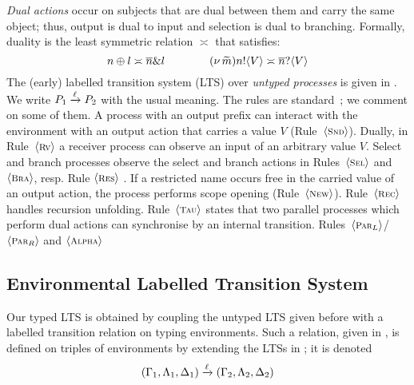 \emph{Dual actions}
occur on subjects that are dual between them and carry the same
object; thus, output is dual to input and 
selection is dual to branching.
Formally, duality 
is the least symmetric relation $\asymp$ that satisfies:
\[
	n \oplus l \asymp \overline{n} \& l
	\qquad \qquad 
	(\nu\, \widetilde{m}) n ! \langle V \rangle \asymp \overline{n} ? \langle V \rangle
\]
The (early) labelled transition system
(LTS) %
over \emph{untyped processes}
is given in
. 
We write $P_1 \xrightarrow{\ell} P_2$ with the usual meaning.
The rules are standard~\cite{KYHH2015,KY2015}; we comment on some of them.
A process with an output prefix can
interact with the environment with an output action that carries a value
$V$ (Rule~${\langle \text{\footnotesize \textsc{Snd}} \rangle}$).  Dually, in Rule~${\langle \text{\footnotesize \textsc{Rv}} \rangle}$ a
receiver process can observe an input of an arbitrary value $V$.
Select and branch processes observe the select and branch
actions in Rules~${\langle \text{\footnotesize \textsc{Sel}} \rangle}$ and ${\langle \text{\footnotesize \textsc{Bra}} \rangle}$, resp.
Rule ${\langle \text{\footnotesize \textsc{Res}} \rangle}$ 
. 
If a restricted name occurs free in
the carried value of an output action,
the process performs scope opening (Rule~${\langle \text{\footnotesize \textsc{New}} \rangle}$).  
Rule~${\langle \text{\footnotesize \textsc{Rec}} \rangle}$ handles recursion unfolding.
Rule~${\langle \text{\footnotesize \textsc{Tau}} \rangle}$ 
states that two parallel processes which perform
dual actions can synchronise by an internal transition.
Rules~${\langle \text{\footnotesize \textsc{Par${}_L$}} \rangle}$/${\langle \text{\footnotesize \textsc{Par${}_R$}} \rangle}$ 
and ${\langle \text{\footnotesize \textsc{Alpha}} \rangle}$ 

\subsection{Environmental Labelled Transition System}
\label{ss:elts}
Our typed LTS is obtained by coupling the untyped LTS given before with a labelled transition relation 
on typing environments. Such a relation, given in , 
is defined on triples of environments by 
extending the LTSs
in \cite{KYHH2015,KY2015}; it is 
denoted
%
\[
	(\Gamma_1, \Lambda_1, \Delta_1) \xrightarrow{\ell} (\Gamma_2, \Lambda_2, \Delta_2)
\]
%
%
